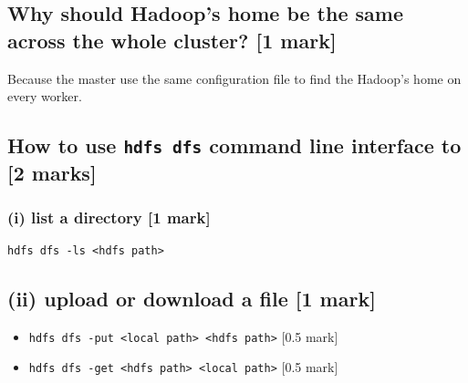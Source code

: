 \documentclass[11pt,a4paper]{article}
\begin{document}
\subsection*{Why should Hadoop's home be the same across the whole cluster? [1 mark]}
Because the master use the same configuration file to find the Hadoop's home on every worker.

\subsection*{How to use \texttt{hdfs dfs} command line interface to [2 marks]}

\subsubsection*{(i) list a directory [1 mark]}
\texttt{hdfs dfs -ls <hdfs path>}

\subsection*{(ii) upload or download a file [1 mark]}
\begin{itemize}
\item \texttt{hdfs dfs -put <local path> <hdfs path>} [0.5 mark]
\item \texttt{hdfs dfs -get <hdfs path> <local path>} [0.5 mark]
\end{itemize}
\end{document}
